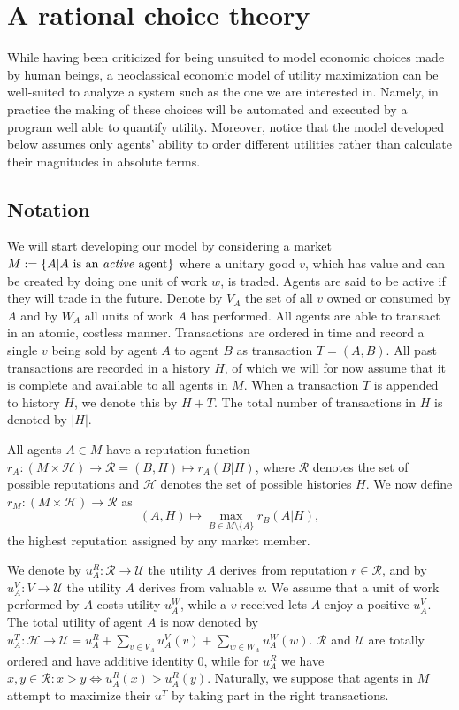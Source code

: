 \chapter{A rational choice theory}
While having been criticized for being unsuited to model economic choices made by human beings, 
a neoclassical economic model of utility maximization can be well-suited to analyze a system such as the one we are interested in. 
Namely, in practice the making of these choices will be automated and executed by a program well able to quantify utility. 
Moreover, notice that the model developed below assumes only agents' ability to order different utilities rather than calculate their magnitudes in absolute terms.

\section{Notation}\label{section:model_notation}
We will start developing our model by considering a market $M := \{ A | A \ \text{is an \emph{active} agent} \}$ where a unitary good $v$, 
which has value and can be created by doing one unit of work $w$, is traded. 
Agents are said to be active if they will trade in the future. 
Denote by $V_A$ the set of all $v$ owned or consumed by $A$ and by $W_A$ all units of work $A$ has performed. 
All agents are able to transact in an atomic, costless manner. 
Transactions are ordered in time and record a single $v$ being sold by agent $A$ to agent $B$ as transaction $T = (A, B)$. 
All past transactions are recorded in a history $H$, 
of which we will for now assume that it is complete and available to all agents in $M$. 
When a transaction $T$ is appended to history $H$, 
we denote this by $H + T$. 
The total number of transactions in $H$ is denoted by $|H|$.

All agents $A \in M$ have a reputation function $r_A: (M \times \mathcal{H}) \to \mathcal{R} = (B, H) \mapsto r_A(B | H)$, 
where $\mathcal{R}$ denotes the set of possible reputations and $\mathcal{H}$ denotes the set of possible histories $H$. 
We now define $r_M: (M \times \mathcal{H}) \to \mathcal{R}$ as
\[(A, H) \mapsto \max_{B \in M \setminus \{ A \}} r_B(A | H),\]
the highest reputation assigned by any market member.

We denote by $u^R_A: \mathcal{R} \to \mathcal{U}$ the utility $A$ derives from reputation $r \in \mathcal{R}$, 
and by $u^V_A: V \to \mathcal{U}$ the utility $A$ derives from valuable $v$. 
We assume that a unit of work performed by $A$ costs utility $u^W_A$, 
while a $v$ received lets $A$ enjoy a positive $u^V_A$. 
The total utility of agent $A$ is now denoted by $u^T_A: \mathcal{H} \to \mathcal{U} = u^R_A + \sum_{v \in V_A} u^V_A(v) + \sum_{w \in W_A} u^W_A(w)$. 
$\mathcal{R}$ and $\mathcal{U}$ are totally ordered and have additive identity $0$, 
while for $u^R_A$ we have $x, y \in \mathcal{R}: x > y \Leftrightarrow u^R_A(x) > u^R_A(y)$. 
Naturally, we suppose that agents in $M$ attempt to maximize their $u^T$ by taking part in the right transactions.

